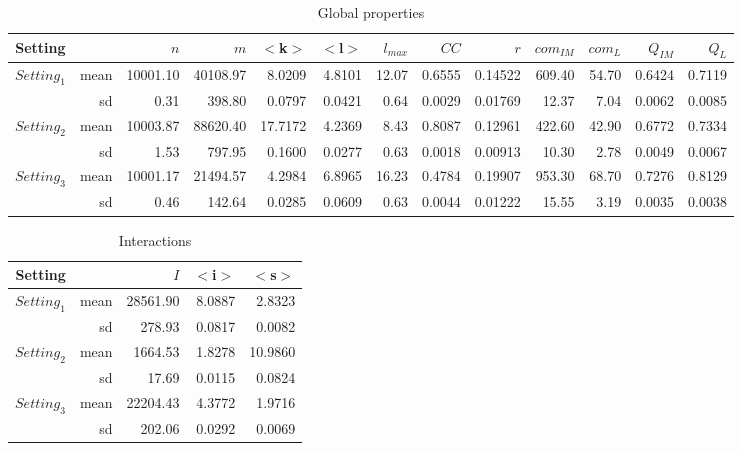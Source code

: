 \begin{table*}[ht]
  \centering
  \caption{Global properties}
		\begin{tabular}{|c|r|rrrrrrrrrrr|}
\hline
Setting &  & $n$ & $m$ & $<$k$>$ &  $<$l$>$ & $l_{max}$ & $CC$ & $r$ & $com_{IM}$ & $com_L$ & $Q_{IM}$ & $Q_L$ \\ 
\hline
$Setting_1$ & mean & 10001.10 & 40108.97 & 8.0209 & 4.8101 & 12.07 & 0.6555 & 0.14522 & 609.40 & 54.70 & 0.6424 & 0.7119 \\ 
& sd & 0.31 & 398.80 & 0.0797 & 0.0421 & 0.64 & 0.0029 & 0.01769 & 12.37 & 7.04 & 0.0062 & 0.0085 \\ 
\hline	
$Setting_2$ & mean & 10003.87 & 88620.40 & 17.7172 & 4.2369 & 8.43  & 0.8087 & 0.12961 & 422.60 & 42.90 & 0.6772 & 0.7334 \\ 
& sd & 1.53 & 797.95 & 0.1600 & 0.0277 & 0.63  & 0.0018 & 0.00913 & 10.30 & 2.78 & 0.0049 & 0.0067 \\ 
\hline
$Setting_3$ & mean & 10001.17 & 21494.57 & 4.2984 & 6.8965 & 16.23 & 0.4784 & 0.19907 & 953.30 & 68.70 & 0.7276 & 0.8129 \\ 
&  sd & 0.46 & 142.64 & 0.0285 & 0.0609 & 0.63 & 0.0044 & 0.01222 & 15.55 & 3.19 & 0.0035 & 0.0038 \\ 
\hline
\end{tabular}%
  \label{tab:gp}%
\end{table*}%
\begin{table}[ht]
  \centering
  \caption{Interactions}
\begin{tabular}{|r|r|rrr|}
	\hline
Setting & & $I$ & $<$i$>$ & $<$s$>$ \\ 
\hline
$Setting_1$ & mean & 28561.90 & 8.0887 & 2.8323 \\ 
&  sd & 278.93 & 0.0817 & 0.0082 \\ 
\hline	
$Setting_2$ & mean & 1664.53 & 1.8278 & 10.9860 \\ 
& sd & 17.69 & 0.0115 & 0.0824 \\
\hline	
$Setting_3$ & mean & 22204.43 & 4.3772 & 1.9716 \\ 
& sd & 202.06 & 0.0292 & 0.0069 \\ 
\hline
	\end{tabular}%
  \label{tab:interact}%
\end{table}%

